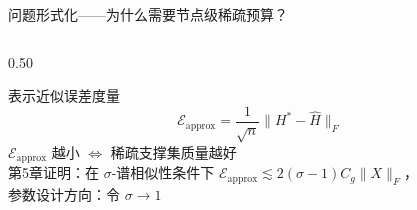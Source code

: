 \documentclass[aspectratio=169,9pt,xcolor=dvipsnames]{beamer}
\begin{document}
\begin{frame}{问题形式化——为什么需要节点级稀疏预算？}
\begin{columns}[T]
\begin{column}{0.50\textwidth}
  \begin{block}{表示近似误差度量}
    \[
      \mathcal{E}_{\mathrm{approx}}=\frac{1}{\sqrt{n}}\|H^*-\hat{H}\|_F
    \]
    $\mathcal{E}_{\mathrm{approx}}$ 越小 $\Leftrightarrow$ 稀疏支撑集质量越好\\[3pt]
    第5章证明：在 $\sigma$-谱相似性条件下
    $\mathcal{E}_{\mathrm{approx}}\lesssim 2(\sigma-1)C_g\|X\|_F$，\\
    参数设计方向：令 $\sigma\to 1$
  \end{block}
\end{column}
\end{columns}
\end{frame}

\end{document}

